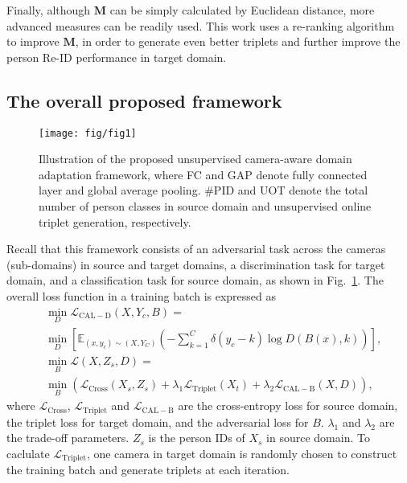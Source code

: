 \documentclass[10pt,twocolumn,letterpaper]{article}
\begin{document}
Finally, although ${\mathbf M}$ can be simply calculated by Euclidean distance, more advanced measures can be readily used. This work uses a re-ranking algorithm~\cite{DBLP:conf/cvpr/ZhongZCL17} to improve ${\mathbf M}$, in order to generate even better triplets and further improve the person Re-ID performance in target domain. 
 
 
\subsection{The overall proposed framework}\label{sec:TOPF}
\begin{figure}\centering
\texttt{[image: fig/fig1]}
\caption{Illustration of the proposed unsupervised camera-aware domain adaptation framework, where FC and GAP denote fully connected layer and global average pooling. \#PID and UOT denote the total number of person classes in source domain and unsupervised online triplet generation, respectively.}
\label{fig1}
\vspace*{-15pt}\end{figure}
 
Recall that this framework consists of an adversarial task across the cameras (sub-domains) in source and target domains, a discrimination task for target domain, and a classification task for source domain, as shown in Fig.~\ref{fig1}. 
The overall loss function in a training batch is expressed as
\begin{equation}\label{eq09}
\begin{aligned}
&\min_{D}\mathcal{L}_\mathrm{CAL-D}(X, Y_c, B)= \\
&\min_{D}\left[\mathbb{E}_{(x,y_c)\sim (X,Y_C)}\left(-\sum_{k=1}^{C}\delta(y_c-k)\log D(B(x), k)\right)\right],\\
&\min_{B}\mathcal{L}(X,Z_{s},D)=\\
&\min_{B}\left(\mathcal{L}_\mathrm{Cross}(X_{s},Z_{s})+\lambda_{1} \mathcal{L}_\mathrm{Triplet}(X_{t})+\lambda_{2}\mathcal{L}_\mathrm{CAL-B}(X,D)\right),
\end{aligned}
\end{equation}where $\mathcal{L}_\mathrm{Cross}$, $\mathcal{L}_\mathrm{Triplet}$ and $\mathcal{L}_\mathrm{CAL-B}$ are the cross-entropy loss for source domain, the triplet loss for target domain, and the adversarial loss for $B$. $\lambda_{1}$ and $\lambda_{2}$ are the trade-off parameters. $Z_{s}$ is the person IDs of $X_{s}$ in source domain. To caclulate $\mathcal{L}_\mathrm{Triplet}$, one camera in target domain is randomly chosen to construct the training batch and generate triplets at each iteration.
 
\end{document}
